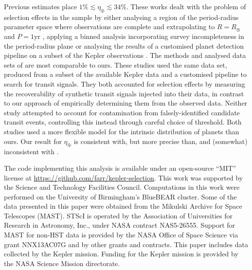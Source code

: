 \documentclass[apjl]{emulateapj}
\newcommand{\etaearth}{\eta_\oplus}
\newcommand{\REarth}{R_\oplus}
\begin{document}
Previous estimates
\citep{Catanzarite2011,Traub2012,Dong2013,Petigura2013,Foreman-Mackey2014}
place $1\% \lesssim \etaearth \lesssim 34\%$.  These works dealt with
the problem of selection effects in the sample by either analysing a
region of the period-radius parameter space where observations are
complete and extrapolating to $R = \REarth$ and $P = 1 \mathrm{yr}$
\citep{Catanzarite2011,Traub2012}, applying a binned analysis
incorporating survey incompleteness in the period-radius plane
\citep{Dong2013,Petigura2013} or analysing the results of a customised
planet detection pipeline on a subset of the Kepler observations
\citep{Petigura2013,Foreman-Mackey2014}.  The methods and analysed
data sets of \citet{Petigura2013,Foreman-Mackey2014} are most
comparable to ours.  These studies used the same data set, produced
\citep{Petigura2013} from a subset of the available Kepler data and a
customised pipeline to search for transit signals.  They both
accounted for selection effects by measuring the recoverability of
synthetic transit signals injected into their data, in contrast to our
approach of empirically determining them from the observed data.
Neither study attempted to account for contamination from
falsely-identified candidate transit events, controlling this instead
through careful choice of threshold.  Both studies used a more
flexible model for the intrinsic distribution of planets than ours.
Our result for $\etaearth$ is consistent with, but more precise than,
\citet{Foreman-Mackey2014} and (somewhat) inconsistent with
\citet{Petigura2013}.

\acknowledgements

The code implementing this analysis is available under an open-source
``MIT'' license at \url{https://github.com/farr/kepler-selection}.
This work was supported by the Science and Technology Facilities
Council.  Computations in this work were performed on the University
of Birmingham's BlueBEAR cluster.  Some of the data presented in this
paper were obtained from the Mikulski Archive for Space Telescopes
(MAST). STScI is operated by the Association of Universities for
Research in Astronomy, Inc., under NASA contract NAS5-26555. Support
for MAST for non-HST data is provided by the NASA Office of Space
Science via grant NNX13AC07G and by other grants and contracts.  This
paper includes data collected by the Kepler mission. Funding for the
Kepler mission is provided by the NASA Science Mission directorate.



\end{document}
